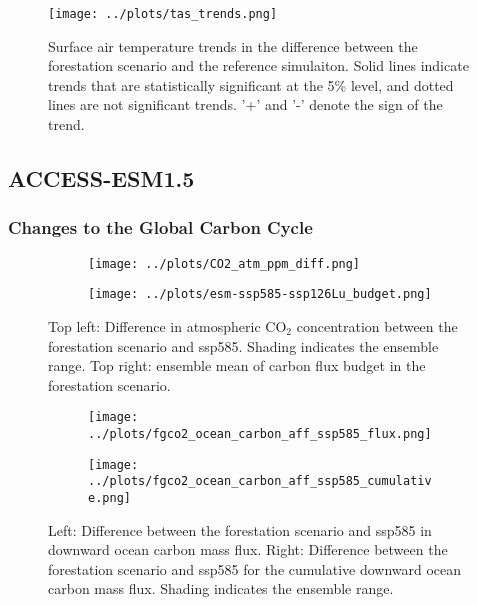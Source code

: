 \documentclass[]{article}
\begin{document}
\begin{figure}[H]
    \centering
    \texttt{[image: ../plots/tas\_trends.png]}
    \caption{Surface air temperature trends in the difference between the forestation scenario and the reference simulaiton. Solid lines indicate trends that are statistically significant at the 5\% level, and dotted lines are not significant trends. '+' and '-' denote the sign of the trend.}
    \label{fig:models_tas_trends}
\end{figure}

\subsection{ACCESS-ESM1.5}

\subsubsection{Changes to the Global Carbon Cycle}

\begin{figure}[H]
    \centering
    \begin{subfigure}[b]{0.4\linewidth}
        \texttt{[image: ../plots/CO2\_atm\_ppm\_diff.png]}
    \end{subfigure}
    \begin{subfigure}[b]{0.4\linewidth}
        \texttt{[image: ../plots/esm-ssp585-ssp126Lu\_budget.png]}
    \end{subfigure}
    \caption{Top left: Difference in atmospheric CO$_2$ concentration between the forestation scenario and ssp585. Shading indicates the ensemble range. Top right: ensemble mean of carbon flux budget in the forestation scenario.}
    \label{fig:atmosphere_carbon}
\end{figure}

\begin{figure}[H]
    \centering
    \begin{subfigure}[b]{0.4\linewidth}
        \texttt{[image: ../plots/fgco2\_ocean\_carbon\_aff\_ssp585\_flux.png]}
    \end{subfigure}
    \begin{subfigure}[b]{0.4\linewidth}
        \texttt{[image: ../plots/fgco2\_ocean\_carbon\_aff\_ssp585\_cumulative.png]}
    \end{subfigure}
    \caption{Left: Difference between the forestation scenario and ssp585 in downward ocean carbon mass flux. Right: Difference between the forestation scenario and ssp585 for the cumulative downward ocean carbon mass flux. Shading indicates the ensemble range.}
    \label{fig:ocean_carbon}
\end{figure}
\end{document}
